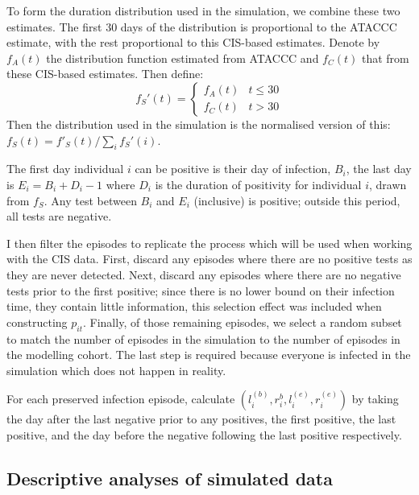 \documentclass[thesis.tex]{subfiles}
\begin{document}
To form the duration distribution used in the simulation, we combine these two estimates.
The first 30 days of the distribution is proportional to the ATACCC estimate, with the rest proportional to this CIS-based estimates.
Denote by $f_A(t)$ the distribution function estimated from ATACCC and $f_C(t)$ that from these CIS-based estimates.
Then define:
$$
f_S'(t) = \begin{cases}
	f_A(t) &t \leq 30 \\
	f_C(t) &t > 30
\end{cases}
$$
Then the distribution used in the simulation is the normalised version of this: $f_S(t) = f'_S(t)/\sum_i f_S'(i)$.

The first day individual $i$ can be positive is their day of infection, $B_i$, the last day is $E_i = B_i + D_i - 1$ where $D_i$ is the duration of positivity for individual $i$, drawn from $f_S$.
Any test between $B_i$ and $E_i$ (inclusive) is positive; outside this period, all tests are negative.

I then filter the episodes to replicate the process which will be used when working with the CIS data.
First, discard any episodes where there are no positive tests as they are never detected.
Next, discard any episodes where there are no negative tests prior to the first positive; since there is no lower bound on their infection time, they contain little information, this selection effect was included when constructing $p_{it}$.
Finally, of those remaining episodes, we select a random subset to match the number of episodes in the simulation to the number of episodes in the modelling cohort.
The last step is required because everyone is infected in the simulation which does not happen in reality.

For each preserved infection episode, calculate $(l_i^{(b)}, r_i^{b}, l_i^{(e)}, r_i^{(e)})$ by taking the day after the last negative prior to any positives, the first positive, the last positive, and the day before the negative following the last positive respectively.

\subsection{Descriptive analyses of simulated data}
\end{document}
